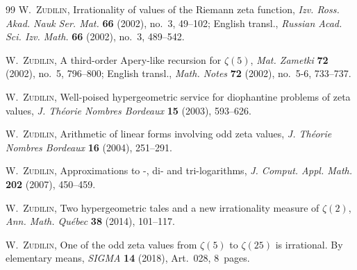 \documentclass[12pt,reqno]{amsart}
\theoremstyle{remark}
\begin{document}
\begin{thebibliography}{99}
\textsc{W.~Zudilin},
Irrationality of values of the Riemann zeta function,
\emph{Izv. Ross. Akad. Nauk Ser. Mat.} \textbf{66} (2002), no.~3, 49--102;
English transl., \emph{Russian Acad. Sci. Izv. Math.} \textbf{66} (2002), no.~3, 489--542.

\textsc{W.~Zudilin},
A third-order Apery-like recursion for $\zeta(5)$,
\emph{Mat. Zametki} \textbf{72} (2002), no.~5, 796--800;
English transl., \emph{Math. Notes} \textbf{72} (2002), no.~5-6, 733--737.

\textsc{W.~Zudilin},
Well-poised hypergeometric service for diophantine problems of zeta values,
\emph{J. Th\'eorie Nombres Bordeaux} \textbf{15} (2003), 593--626.

\textsc{W.~Zudilin},
Arithmetic of linear forms involving odd zeta values,
\emph{J. Th\'eorie Nombres Bordeaux} \textbf{16} (2004), 251--291.

\textsc{W.~Zudilin},
Approximations to -, di- and tri-logarithms,
\emph{J. Comput. Appl. Math.} \textbf{202} (2007), 450--459.

\textsc{W.~Zudilin},
Two hypergeometric tales and a new irrationality measure of $\zeta(2)$,
\emph{Ann. Math. Qu\'ebec} \textbf{38} (2014), 101--117.

\textsc{W.~Zudilin},
One of the odd zeta values from $\zeta(5)$ to $\zeta(25)$ is irrational. By elementary means,
\emph{SIGMA} \textbf{14} (2018), Art.~028, 8~pages.

\end{thebibliography}
\end{document}
